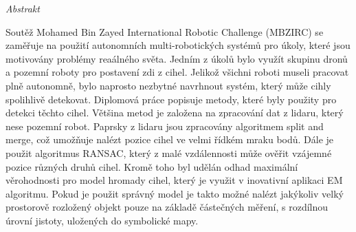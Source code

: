 \vfill
\begin{center}
{\it \large Abstrakt}
\vspace{0.2cm}

\begin{minipage}{0.8\textwidth}{
Soutěž Mohamed Bin Zayed International Robotic Challenge (MBZIRC) se zaměřuje na použití autonomních multi-robotických systémů pro úkoly, které jsou motivovány problémy reaálného světa. Jedním z úkolů bylo využít skupinu dronů a pozemní roboty pro postavení zdi z cihel. Jelikož všichni roboti museli pracovat plně autonomně, bylo naprosto nezbytné navrhnout systém, který může cihly spolihlivě detekovat. Diplomová práce popisuje metody, které byly použity pro detekci těchto cihel. Většina metod je založena na zpracování dat z lidaru, který nese pozemní robot. Paprsky z lidaru jsou zpracovány algoritmem split and merge, což umožňuje nalézt pozice cihel ve velmi řídkém mraku bodů. Dále je použit algoritmus RANSAC, který z malé vzdálennosti může ověřit vzájemné pozice různých druhů cihel. Kromě toho byl udělán odhad maximální věrohodnosti pro model hromady cihel, který je využit v inovativní aplikaci EM algoritmu. Pokud je použit správný model je takto možné nalézt jakýkoliv velký prostorově rozložený objekt pouze na základě částečných měření, s rozdílnou úrovní jistoty, uložených do symbolické mapy.
}
\end{minipage}
\end{center}
\vfill
\vspace{1cm}
\newpage{}
